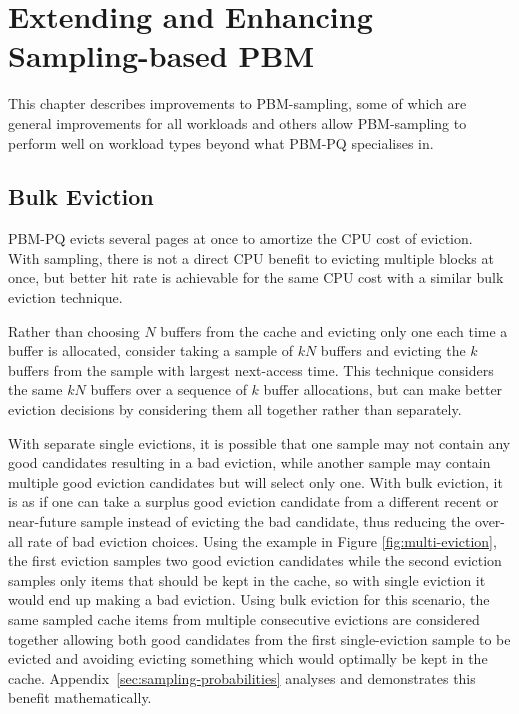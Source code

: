 
\chapter{Extending and Enhancing Sampling-based PBM}
\label{ch:extending-sampling}
This chapter describes improvements to PBM-sampling, some of which are general improvements for all workloads and others allow PBM-sampling to perform well on workload types beyond what PBM-PQ specialises in.

\section{Bulk Eviction\label{sec:sampling-bulk-eviction}}

PBM-PQ evicts several pages at once to amortize the CPU cost of eviction.~\cite{pbm} With sampling, there is not a direct CPU benefit to evicting multiple blocks at once, but better hit rate is achievable for the same CPU cost with a similar bulk eviction technique.

Rather than choosing $N$ buffers from the cache and evicting only one each time a buffer is allocated, consider taking a sample of $kN$ buffers and evicting the $k$ buffers from the sample with largest next-access time. This technique considers the same $kN$ buffers over a sequence of $k$ buffer allocations, but can make better eviction decisions by considering them all together rather than separately.

With separate single evictions, it is possible that one sample may not contain any good candidates resulting in a bad eviction, while another sample may contain multiple good eviction candidates but will select only one. With bulk eviction, it is as if one can take a surplus good eviction candidate from a different recent or near-future sample instead of evicting the bad candidate, thus reducing the over-all rate of bad eviction choices. Using the example in Figure \ref{fig:multi-eviction}, the first eviction samples two good eviction candidates while the second eviction samples only items that should be kept in the cache, so with single eviction it would end up making a bad eviction. Using bulk eviction for this scenario, the same sampled cache items from multiple consecutive evictions are considered together allowing both good candidates from the first single-eviction sample to be evicted and avoiding evicting something which would optimally be kept in the cache. Appendix~\ref{sec:sampling-probabilities} analyses and demonstrates this benefit mathematically.


